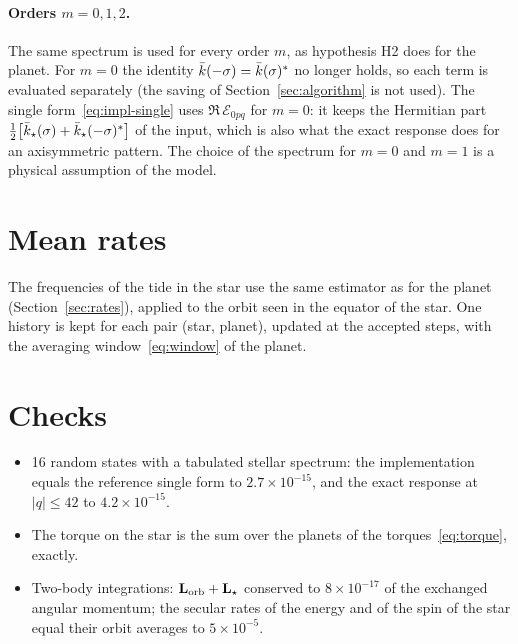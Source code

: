 \paragraph{Orders $m=0,1,2$.} The same spectrum is used for every order $m$, as hypothesis H2 does for the planet. For $m=0$ the identity $\bar k(-\sigma)=\bar k(\sigma)^*$ no longer holds, so each term is evaluated separately (the saving of Section~\ref{sec:algorithm} is not used). The single form~\eqref{eq:impl-single} uses $\Re\,\mathcal E_{0pq}$ for $m=0$: it keeps the Hermitian part $\tfrac12\big[\bar k_\star(\sigma)+\bar k_\star(-\sigma)^*\big]$ of the input, which is also what the exact response does for an axisymmetric pattern. The choice of the spectrum for $m=0$ and $m=1$ is a physical assumption of the model.

\section{Mean rates}
The frequencies of the tide in the star use the same estimator as for the planet (Section~\ref{sec:rates}), applied to the orbit seen in the equator of the star. One history is kept for each pair (star, planet), updated at the accepted steps, with the averaging window~\eqref{eq:window} of the planet.

\section{Checks}
\begin{itemize}
  \item 16 random states with a tabulated stellar spectrum: the implementation equals the reference single form to $2.7\times10^{-15}$, and the exact response at $|q|\le42$ to $4.2\times10^{-15}$.
  \item The torque on the star is the sum over the planets of the torques~\eqref{eq:torque}, exactly.
  \item Two-body integrations: $\mathbf L_{\rm orb}+\mathbf L_\star$ conserved to $8\times10^{-17}$ of the exchanged angular momentum; the secular rates of the energy and of the spin of the star equal their orbit averages to $5\times10^{-5}$.
\end{itemize}
